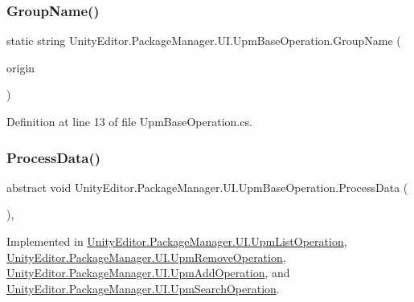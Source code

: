 \subsubsection{\texorpdfstring{GroupName()}{GroupName()}}
{\footnotesize\ttfamily static string Unity\+Editor.\+Package\+Manager.\+U\+I.\+Upm\+Base\+Operation.\+Group\+Name (\begin{DoxyParamCaption}\item[{Package\+Source}]{origin }\end{DoxyParamCaption})\hspace{0.3cm}{\ttfamily [static]}}



Definition at line 13 of file Upm\+Base\+Operation.\+cs.

\mbox{\label{class_unity_editor_1_1_package_manager_1_1_u_i_1_1_upm_base_operation_a5a4730e21b4cea1052e494cc5ca0eb84}} 
\subsubsection{\texorpdfstring{ProcessData()}{ProcessData()}}
{\footnotesize\ttfamily abstract void Unity\+Editor.\+Package\+Manager.\+U\+I.\+Upm\+Base\+Operation.\+Process\+Data (\begin{DoxyParamCaption}{ }\end{DoxyParamCaption})\hspace{0.3cm}{\ttfamily [protected]}, {}}



Implemented in \mbox{\hyperlink{class_unity_editor_1_1_package_manager_1_1_u_i_1_1_upm_list_operation_ae7434ca3a6b01a299d8a9860dbd32832}{Unity\+Editor.\+Package\+Manager.\+U\+I.\+Upm\+List\+Operation}}, \mbox{\hyperlink{class_unity_editor_1_1_package_manager_1_1_u_i_1_1_upm_remove_operation_abb635a83eb84f843c45a9631d4dc782f}{Unity\+Editor.\+Package\+Manager.\+U\+I.\+Upm\+Remove\+Operation}}, \mbox{\hyperlink{class_unity_editor_1_1_package_manager_1_1_u_i_1_1_upm_add_operation_afcf098692ff87d8f0b657a5c52e165b2}{Unity\+Editor.\+Package\+Manager.\+U\+I.\+Upm\+Add\+Operation}}, and \mbox{\hyperlink{class_unity_editor_1_1_package_manager_1_1_u_i_1_1_upm_search_operation_a1a7f1b1ca0ed96bcee79db2246cc3a4c}{Unity\+Editor.\+Package\+Manager.\+U\+I.\+Upm\+Search\+Operation}}.

